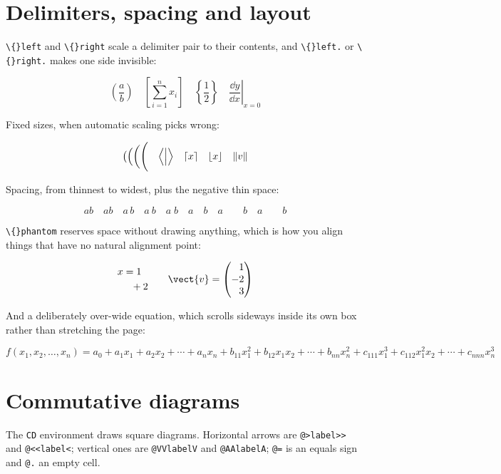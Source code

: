 \section{Delimiters, spacing and layout}

\texttt{\textbackslash\{\}left} and \texttt{\textbackslash\{\}right} scale a delimiter pair to their contents, and \texttt{\textbackslash\{\}left.} or \texttt{\textbackslash\{\}right.} makes one side invisible:

\[
\left( \frac{a}{b} \right) \quad \left[ \sum_{i=1}^n x_i \right] \quad \left\{ \frac{1}{2} \right\} \quad \left. \frac{\dd y}{\dd x} \right|_{x = 0}
\]

Fixed sizes, when automatic scaling picks wrong:

\[
\big( \Big( \bigg( \Bigg( \quad \Bigl\langle \Bigm| \Bigr\rangle \quad \lceil x \rceil \quad \lfloor x \rfloor \quad \lVert v \rVert
\]

Spacing, from thinnest to widest, plus the negative thin space:

\[
a\!b \quad ab \quad a\,b \quad a\:b \quad a\;b \quad a\quad b \quad a\qquad b \quad a\hspace{2em}b
\]

\texttt{\textbackslash\{\}phantom} reserves space without drawing anything, which is how you align things that have no natural alignment point:

\[
\begin{aligned}
x &= 1 \\
\phantom{x} &\phantom{=} + 2
\end{aligned}
\qquad
\vect{v} = \begin{pmatrix} \phantom{-}1 \\ -2 \\ \phantom{-}3 \end{pmatrix}
\]

And a deliberately over-wide equation, which scrolls sideways inside its own box rather than stretching the page:

\[
f(x_1, x_2, \ldots, x_n) = a_0 + a_1 x_1 + a_2 x_2 + \cdots + a_n x_n + b_{11} x_1^2 + b_{12} x_1 x_2 + \cdots + b_{nn} x_n^2 + c_{111} x_1^3 + c_{112} x_1^2 x_2 + \cdots + c_{nnn} x_n^3 \tag{9.1}
\]

\section{Commutative diagrams}

The \texttt{CD} environment draws square diagrams. Horizontal arrows are \texttt{@>label>>} and \texttt{@<<label<}; vertical ones are \texttt{@VVlabelV} and \texttt{@AAlabelA}; \texttt{@=} is an equals sign and \texttt{@.} an empty cell.

